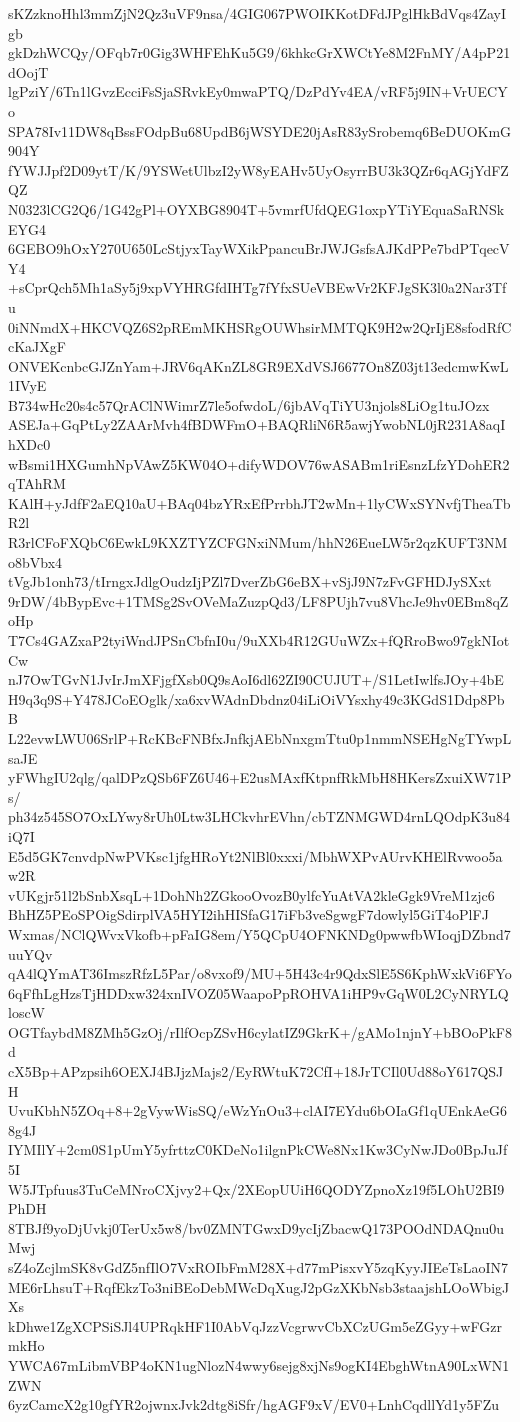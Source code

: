 sKZzknoHhl3mmZjN2Qz3uVF9nsa/4GIG067PWOIKKotDFdJPglHkBdVqs4ZayIgb
gkDzhWCQy/OFqb7r0Gig3WHFEhKu5G9/6khkcGrXWCtYe8M2FnMY/A4pP21dOojT
lgPziY/6Tn1lGvzEcciFsSjaSRvkEy0mwaPTQ/DzPdYv4EA/vRF5j9IN+VrUECYo
SPA78Iv11DW8qBssFOdpBu68UpdB6jWSYDE20jAsR83ySrobemq6BeDUOKmG904Y
fYWJJpf2D09ytT/K/9YSWetUlbzI2yW8yEAHv5UyOsyrrBU3k3QZr6qAGjYdFZQZ
N0323lCG2Q6/1G42gPl+OYXBG8904T+5vmrfUfdQEG1oxpYTiYEquaSaRNSkEYG4
6GEBO9hOxY270U650LcStjyxTayWXikPpancuBrJWJGsfsAJKdPPe7bdPTqecVY4
+sCprQch5Mh1aSy5j9xpVYHRGfdIHTg7fYfxSUeVBEwVr2KFJgSK3l0a2Nar3Tfu
0iNNmdX+HKCVQZ6S2pREmMKHSRgOUWhsirMMTQK9H2w2QrIjE8sfodRfCcKaJXgF
ONVEKcnbcGJZnYam+JRV6qAKnZL8GR9EXdVSJ6677On8Z03jt13edcmwKwL1IVyE
B734wHc20s4c57QrAClNWimrZ7le5ofwdoL/6jbAVqTiYU3njols8LiOg1tuJOzx
ASEJa+GqPtLy2ZAArMvh4fBDWFmO+BAQRliN6R5awjYwobNL0jR231A8aqIhXDc0
wBsmi1HXGumhNpVAwZ5KW04O+difyWDOV76wASABm1riEsnzLfzYDohER2qTAhRM
KAlH+yJdfF2aEQ10aU+BAq04bzYRxEfPrrbhJT2wMn+1lyCWxSYNvfjTheaTbR2l
R3rlCFoFXQbC6EwkL9KXZTYZCFGNxiNMum/hhN26EueLW5r2qzKUFT3NMo8bVbx4
tVgJb1onh73/tIrngxJdlgOudzIjPZl7DverZbG6eBX+vSjJ9N7zFvGFHDJySXxt
9rDW/4bBypEvc+1TMSg2SvOVeMaZuzpQd3/LF8PUjh7vu8VhcJe9hv0EBm8qZoHp
T7Cs4GAZxaP2tyiWndJPSnCbfnI0u/9uXXb4R12GUuWZx+fQRroBwo97gkNIotCw
nJ7OwTGvN1JvIrJmXFjgfXsb0Q9sAoI6dl62ZI90CUJUT+/S1LetIwlfsJOy+4bE
H9q3q9S+Y478JCoEOglk/xa6xvWAdnDbdnz04iLiOiVYsxhy49c3KGdS1Ddp8PbB
L22evwLWU06SrlP+RcKBcFNBfxJnfkjAEbNnxgmTtu0p1nmmNSEHgNgTYwpLsaJE
yFWhgIU2qlg/qalDPzQSb6FZ6U46+E2usMAxfKtpnfRkMbH8HKersZxuiXW71Ps/
ph34z545SO7OxLYwy8rUh0Ltw3LHCkvhrEVhn/cbTZNMGWD4rnLQOdpK3u84iQ7I
E5d5GK7cnvdpNwPVKsc1jfgHRoYt2NlBl0xxxi/MbhWXPvAUrvKHElRvwoo5aw2R
vUKgjr51l2bSnbXsqL+1DohNh2ZGkooOvozB0ylfcYuAtVA2kleGgk9VreM1zjc6
BhHZ5PEoSPOigSdirplVA5HYI2ihHISfaG17iFb3veSgwgF7dowlyl5GiT4oPlFJ
Wxmas/NClQWvxVkofb+pFaIG8em/Y5QCpU4OFNKNDg0pwwfbWIoqjDZbnd7uuYQv
qA4lQYmAT36ImszRfzL5Par/o8vxof9/MU+5H43c4r9QdxSlE5S6KphWxkVi6FYo
6qFfhLgHzsTjHDDxw324xnIVOZ05WaapoPpROHVA1iHP9vGqW0L2CyNRYLQloscW
OGTfaybdM8ZMh5GzOj/rIlfOcpZSvH6cylatIZ9GkrK+/gAMo1njnY+bBOoPkF8d
cX5Bp+APzpsih6OEXJ4BJjzMajs2/EyRWtuK72CfI+18JrTCIl0Ud88oY617QSJH
UvuKbhN5ZOq+8+2gVywWisSQ/eWzYnOu3+clAI7EYdu6bOIaGf1qUEnkAeG68g4J
IYMIlY+2cm0S1pUmY5yfrttzC0KDeNo1ilgnPkCWe8Nx1Kw3CyNwJDo0BpJuJf5I
W5JTpfuus3TuCeMNroCXjvy2+Qx/2XEopUUiH6QODYZpnoXz19f5LOhU2BI9PhDH
8TBJf9yoDjUvkj0TerUx5w8/bv0ZMNTGwxD9ycIjZbacwQ173POOdNDAQnu0uMwj
sZ4oZcjlmSK8vGdZ5nfIlO7VxROIbFmM28X+d77mPisxvY5zqKyyJIEeTsLaoIN7
ME6rLhsuT+RqfEkzTo3niBEoDebMWcDqXugJ2pGzXKbNsb3staajshLOoWbigJXs
kDhwe1ZgXCPSiSJl4UPRqkHF1I0AbVqJzzVcgrwvCbXCzUGm5eZGyy+wFGzrmkHo
YWCA67mLibmVBP4oKN1ugNlozN4wwy6sejg8xjNs9ogKI4EbghWtnA90LxWN1ZWN
6yzCamcX2g10gfYR2ojwnxJvk2dtg8iSfr/hgAGF9xV/EV0+LnhCqdllYd1y5FZu
